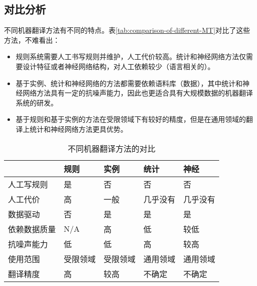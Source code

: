 
\subsection{对比分析}

\parinterval 不同机器翻译方法有不同的特点。表\ref{tab:comparison-of-different-MT}对比了这些方法，不难看出：

\begin{itemize}
\vspace{0.5em}
\item 规则系统需要人工书写规则并维护，人工代价较高。统计和神经网络方法仅需要设计特征或者神经网络结构，对人工依赖较少（语言相关的）。
\vspace{0.5em}
\item 基于实例、统计和神经网络的方法都需要依赖语料库（数据），其中统计和神经网络方法具有一定的抗噪声能力，因此也更适合具有大规模数据的机器翻译系统的研发。
\vspace{0.5em}
\item 基于规则和基于实例的方法在受限领域下有较好的精度，但是在通用领域的翻译上统计和神经网络方法更具优势。
\vspace{0.5em}
\end{itemize}

\begin{table}[htp]{
\begin{center}
\caption{不同机器翻译方法的对比}
\label{tab:comparison-of-different-MT}
\begin{tabular}{l | l l l l}
& \parbox{3.8em}{规则} & \parbox{3.8em}{实例} & \parbox{3.8em}{统计} & \parbox{3.8em}
{神经} \\
\hline

人工写规则 & 是 & 否 & 否 & 否\\
人工代价 & 高 & 一般 & 几乎没有 & 几乎没有 \\
数据驱动 & 否 & 是 & 是 & 是\\
依赖数据质量 & N/A & 高 & 低 & 较低\\
抗噪声能力 & 低 & 低 & 高 & 较高 \\
使用范围 & 受限领域 & 受限领域 & 通用领域 & 通用领域 \\
翻译精度 & 高 & 较高 & 不确定 & 不确定 \\
\end{tabular}
\end{center}
\label{tab:1-1}
}\end{table}

